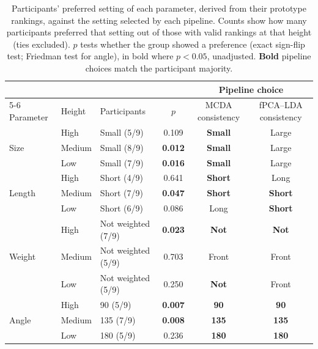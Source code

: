 \begin{table}[htbp]
\centering
\small
\caption{Participants' preferred setting of each parameter, derived from their
prototype rankings, against the setting selected by each pipeline. Counts show how
many participants preferred that setting out of those with valid rankings at that
height (ties excluded). $p$ tests whether the group showed a preference (exact
sign-flip test; Friedman test for angle), in bold where $p < 0.05$, unadjusted.
\textbf{Bold} pipeline choices match the participant majority.}
\label{tab:participant_pipeline_agreement}
\begin{tabular}{@{}lll c cc@{}}
\toprule
 & & & & \multicolumn{2}{c}{Pipeline choice} \\
\cmidrule(l){5-6}
Parameter & Height & Participants & $p$ & MCDA consistency & fPCA--LDA consistency \\
\midrule
\multirow{3}{*}{Size} & High & Small (5/9) & 0.109 & \textbf{Small} & Large \\
 & Medium & Small (8/9) & \textbf{0.012} & \textbf{Small} & Large \\
 & Low & Small (7/9) & \textbf{0.016} & \textbf{Small} & Large \\
\midrule
\multirow{3}{*}{Length} & High & Short (4/9) & 0.641 & \textbf{Short} & Long \\
 & Medium & Short (7/9) & \textbf{0.047} & \textbf{Short} & \textbf{Short} \\
 & Low & Short (6/9) & 0.086 & Long & \textbf{Short} \\
\midrule
\multirow{3}{*}{Weight} & High & Not weighted (7/9) & \textbf{0.023} & \textbf{Not} & \textbf{Not} \\
 & Medium & Not weighted (5/9) & 0.703 & Front & Front \\
 & Low & Not weighted (5/9) & 0.250 & \textbf{Not} & Front \\
\midrule
\multirow{3}{*}{Angle} & High & 90\textdegree{} (5/9) & \textbf{0.007} & \textbf{90\textdegree{}} & \textbf{90\textdegree{}} \\
 & Medium & 135\textdegree{} (7/9) & \textbf{0.008} & \textbf{135\textdegree{}} & \textbf{135\textdegree{}} \\
 & Low & 180\textdegree{} (5/9) & 0.236 & \textbf{180\textdegree{}} & \textbf{180\textdegree{}} \\
\bottomrule
\end{tabular}
\end{table}
